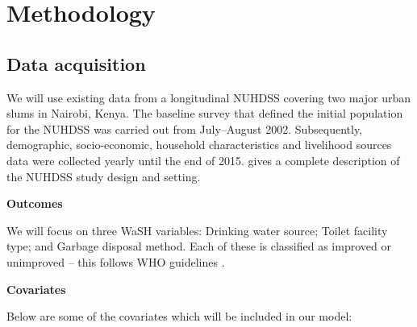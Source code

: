 \section*{Methodology}

\subsection*{Data acquisition}

We will use existing data from a longitudinal NUHDSS covering two major urban slums in Nairobi, Kenya. The baseline survey that defined the initial population for the NUHDSS was carried out from July–August 2002. Subsequently, demographic, socio-economic, household characteristics  and livelihood sources data were collected yearly until the end of 2015. \citet{beguy2015health} gives a complete description of the NUHDSS study design and setting.

\textbf{Outcomes}

We will focus on three WaSH variables: Drinking water source; Toilet facility type; and Garbage disposal method. Each of these is classified as improved or unimproved -- this follows WHO guidelines \citep{journal.pone.0151645}.

\textbf{Covariates}

Below are some of the covariates which will be included in our model:

